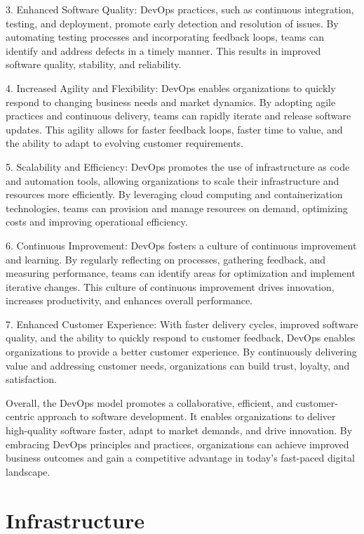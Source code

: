 \documentclass[
12pt,
oneside, 
onehalfspacing, 
nolistspacing, 
parskip, 
chapterinoneline, 
]{AASTCOMPUTER}
\begin{document}
3. Enhanced Software Quality: DevOps practices, such as continuous integration, testing, and deployment, promote early detection and resolution of issues. By automating testing processes and incorporating feedback loops, teams can identify and address defects in a timely manner. This results in improved software quality, stability, and reliability.

4. Increased Agility and Flexibility: DevOps enables organizations to quickly respond to changing business needs and market dynamics. By adopting agile practices and continuous delivery, teams can rapidly iterate and release software updates. This agility allows for faster feedback loops, faster time to value, and the ability to adapt to evolving customer requirements.

5. Scalability and Efficiency: DevOps promotes the use of infrastructure as code and automation tools, allowing organizations to scale their infrastructure and resources more efficiently. By leveraging cloud computing and containerization technologies, teams can provision and manage resources on demand, optimizing costs and improving operational efficiency.

6. Continuous Improvement: DevOps fosters a culture of continuous improvement and learning. By regularly reflecting on processes, gathering feedback, and measuring performance, teams can identify areas for optimization and implement iterative changes. This culture of continuous improvement drives innovation, increases productivity, and enhances overall performance.

7. Enhanced Customer Experience: With faster delivery cycles, improved software quality, and the ability to quickly respond to customer feedback, DevOps enables organizations to provide a better customer experience. By continuously delivering value and addressing customer needs, organizations can build trust, loyalty, and satisfaction.

Overall, the DevOps model promotes a collaborative, efficient, and customer-centric approach to software development. It enables organizations to deliver high-quality software faster, adapt to market demands, and drive innovation. By embracing DevOps principles and practices, organizations can achieve improved business outcomes and gain a competitive advantage in today's fast-paced digital landscape.
\newpage
\section{Infrastructure}
\end{document}
